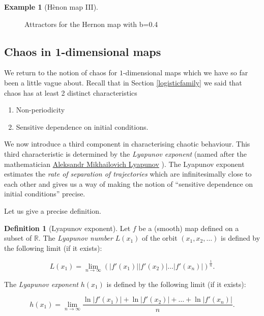\documentclass[
  a4paper,
  oneside,
  final]{krantz}
\providecommand{\tightlist}{%
  \setlength{\itemsep}{0pt}\setlength{\parskip}{0pt}}
\newcommand{\R}{\mathbb{R}}
\theoremstyle{definition}
\newtheorem{definition}{Definition}[chapter]
\theoremstyle{definition}
\newtheorem{example}{Example}[chapter]
\theoremstyle{definition}
\theoremstyle{definition}
\theoremstyle{remark}
\begin{document}
\begin{example}[Hènon map III]
\begin{figure}
{}

\caption{Attractors for the Hernon map with b=0.4}\label{fig:Henonsquarevarying}
\end{figure}

\end{example}

\hypertarget{chaos1dim}{%
\subsection{Chaos in 1-dimensional maps}\label{chaos1dim}}

We return to the notion of chaos for \(1\)-dimensional maps which we have so far been a little vague about. Recall that in Section \ref{logisticfamily} we said that chaos has at least 2 distinct characteristics

\begin{enumerate}
\def\labelenumi{\arabic{enumi}.}
\tightlist
\item
  Non-periodicity
\item
  Sensitive dependence on initial conditions.
\end{enumerate}

We now introduce a third component in characterising chaotic behaviour. This third characteristic is determined by the \emph{Lyapunov exponent} (named after the mathematician \href{https://mathshistory.st-andrews.ac.uk/Biographies/Lyapunov}{Aleksandr Mikhailovich Lyapunov} ). The Lyapunov exponent estimates the \emph{rate of separation of trajectories} which are infinitesimally close to each other and gives us a way of making the notion of ``sensitive dependence on initial conditions'' precise.

Let us give a precise definition.

\begin{definition}[Lyapunov exponent]
\protect\hypertarget{def:Lyapunovexponent}{}\label{def:Lyapunovexponent}Let \(f\) be a (smooth) map defined on a subset of \(\R\). The \emph{Lyapunov number} \(L(x_1)\) of the orbit \((x_1, x_2, \ldots )\) is defined by the following limit (if it exists):

\[ L(x_1) = \lim_{n\to \infty}(|f'(x_1)| |f'(x_2)|\ldots |f'(x_n)|)^{\frac{1}{n}} .\]

The \emph{Lyapunov exponent} \(h(x_1)\) is defined by the following limit (if it exists):

\[ h(x_1) = \lim_{n \to \infty} \dfrac{\ln|f'(x_1)| + \ln|f'(x_2)|+ \ldots + \ln|f'(x_n)|}{n}.\]
\end{definition}
\end{document}
